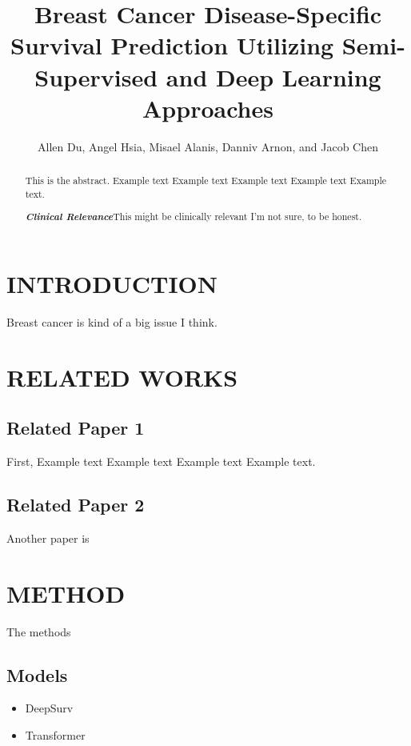 \documentclass[letterpaper, 10 pt, conference]{ieeeconf}  %
\title{\LARGE \bf
Breast Cancer Disease-Specific Survival Prediction Utilizing Semi-Supervised and Deep Learning Approaches
}
\author{Allen Du,
Angel Hsia, 
Misael Alanis, 
Danniv Arnon, and
Jacob Chen%
}
\begin{document}
\maketitle
\thispagestyle{empty}
\pagestyle{empty}


\begin{abstract}

This is the abstract. Example text Example text Example text Example text Example text.

{\textbf{\textit{Clinical Relevance}}}\textemdash This might be clinically relevant I'm not sure, to be honest.

\end{abstract}


\section{INTRODUCTION}

Breast cancer is kind of a big issue I think.

\section{RELATED WORKS}

\subsection{Related Paper 1}

First, Example text Example text Example text Example text.

\subsection{Related Paper 2}

Another paper is

\section{METHOD}

The methods

\subsection{Models}

\begin{itemize}

\item DeepSurv
\item Transformer

\end{itemize}
\end{document}
